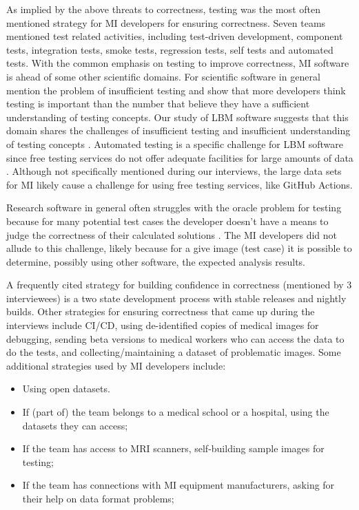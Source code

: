 \documentclass[final, 3p, times, authoryear]{elsarticle}
\begin{document}
\begin{enumerate}
As implied by the above threats to correctness, testing was the most often
mentioned strategy for MI developers for ensuring correctness.  Seven teams
mentioned test related activities, including test-driven development, component
tests, integration tests, smoke tests, regression tests, self tests and
automated tests.  With the common emphasis on testing to improve correctness, MI
software is ahead of some other scientific domains.  For scientific software in
general \citet{PintoEtAl2018} mention the problem of insufficient testing and
\citet{HannayEtAl2009} show that more developers think testing is important than
the number that believe they have a sufficient understanding of testing
concepts.  Our study of LBM software suggests that this domain shares the
challenges of insufficient testing and insufficient understanding of testing
concepts \citep{SmithEtAl2022}. Automated testing is a specific challenge for
LBM software since free testing services do not offer adequate facilities for
large amounts of data \citep{SmithEtAl2022}. Although not specifically mentioned
during our interviews, the large data sets for MI likely cause a challenge for
using free testing services, like GitHub Actions.

Research software in general often struggles with the oracle problem for testing
because for many potential test cases the developer doesn't have a means to
judge the correctness of their calculated solutions \citep{HannayEtAl2009,
KanewalaAndBieman2013, KellyEtAl2011, WieseEtAl2019}.  The MI developers did not
allude to this challenge, likely because for a give image (test case) it is
possible to determine, possibly using other software, the expected analysis
results.

A frequently cited strategy for building confidence in correctness (mentioned by
3 interviewees) is a two state development process with stable releases and
nightly builds.  Other strategies for ensuring correctness that came up during
the interviews include CI/CD, using de-identified copies of medical images for
debugging, sending beta versions to medical workers who can access the data to
do the tests, and collecting/maintaining a dataset of problematic images.  Some
additional strategies used by MI developers include:

\begin{itemize}
\item Using open datasets.
\item If (part of) the team belongs to a medical school or a hospital, using the
datasets they can access;
\item If the team has access to MRI scanners, self-building sample images for
testing;
\item If the team has connections with MI equipment manufacturers, asking for
their help on data format problems;
\end{itemize}


\end{enumerate}
\end{document}

